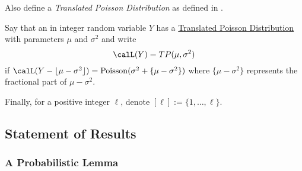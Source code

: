 Also define a \emph{Translated Poisson Distribution} as defined in \cite{rollin2007}.
\begin{definition}
		\label{def:PTAS-2.1}
		Say that an in integer random variable $Y$ has a \underline{Translated Poisson Distribution} with parameters $\mu$ and $\sigma^2$ and write 
		\[\calL(Y) = TP(\mu, \sigma^2)\]
		if $\calL(Y - \lfloor\mu -\sigma^2\rfloor) = \Poisson(\sigma^2 + \{\mu - \sigma^2\})$ where $\{\mu - \sigma^2\}$ represents the fractional part of $\mu - \sigma^2$.
\end{definition}
Finally, for a positive integer $\ell$, denote $[\ell] := \{1,\dots, \ell\}$.

\subsection{Statement of Results}
\subsubsection{A Probabilistic Lemma} 

